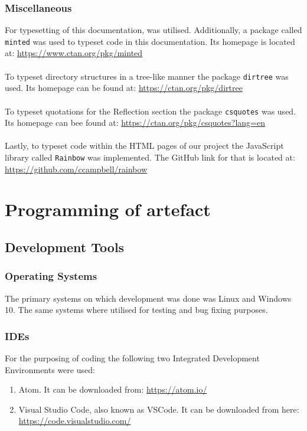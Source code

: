 \documentclass[a4paper, 12pt, titlepage]{report}
\begin{document}
\subsection{Miscellaneous}
For typesetting of this documentation,  was utilised. Additionally, a  package called \texttt{minted} was used to typeset code in this documentation. Its homepage is located at: \url{https://www.ctan.org/pkg/minted}\\\\
To typeset directory structures in a tree-like manner the  package \texttt{dirtree} was used. Its homepage can be found at: \url{https://ctan.org/pkg/dirtree}\\\\
To typeset quotations for the Reflection section the  package \texttt{csquotes} was used. Its homepage can bee found at: \url{https://ctan.org/pkg/csquotes?lang=en}\\\\
Lastly, to typeset code within the HTML pages of our project the JavaScript library called \texttt{Rainbow} was implemented. The GitHub link for that is located at:\\
\url{https://github.com/ccampbell/rainbow}
\chapter{Programming of artefact}
\section{Development Tools}
\subsection{Operating Systems}
The primary systems on which development was done was Linux and Windows 10. The same systems where utilised for testing and bug fixing purposes.
\subsection{IDEs}
For the purposing of coding the following two Integrated Development Environments were used:
\begin{enumerate}
\item Atom. It can be downloaded from: \url{https://atom.io/}
\item Visual Studio Code, also known as VSCode. It can be downloaded from here: \url{https://code.visualstudio.com/}
\end{enumerate}
\end{document}
